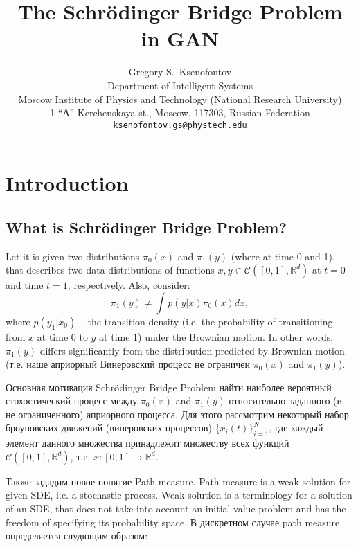 \documentclass{article}
\title{The Schrödinger Bridge Problem in GAN}
\author{ Gregory S.~Ksenofontov\\
	Department of Intelligent Systems\\
	Moscow Institute of Physics and Technology (National Research University)\\
	1 “А” Kerchenskaya st., Moscow, 117303, Russian Federation \\
	\texttt{ksenofontov.gs@phystech.edu} \\
}
\date{}
\begin{document}
\maketitle

\begin{abstract}
	\lipsum[1]
\end{abstract}



\section{Introduction}
\subsection{What is Schrödinger Bridge Problem?}
Let it is given two  distributions $\pi_0(x)$ and $\pi_1(y)$ (where at time 0 and 1), that describes two data distributions of  functions  $x, y\in\mathcal{C}([0,1], \mathbb{R}^d)$ at $t=0$ and time $t=1$, respectively. Also, consider:
$$\pi_1(y) \neq \int p(y|x)\pi_0(x)dx,$$
where $p(y_1|x_0)$ -- the transition density (i.e. the probability of transitioning from $x$ at time $0$ to $y$ at time $1$) under the Brownian motion. In other words, $\pi_1(y)$ differs significantly from the distribution predicted by Brownian motion (т.е. наше априорный Винеровский процесс не ограничен $\pi_0(x)$ and $\pi_1(y)$). \par 
Основная мотивация Schrödinger Bridge Problem найти наиболее вероятный стохостический процесс между $\pi_0(x)$ and $\pi_1(y)$ относительно заданного (и не ограниченного) априорного процесса. Для этого рассмотрим некоторый набор броуновских движений (винеровских процессов) \{$x_i(t)\}^N_{i=1}$, где каждый элемент данного множества принадлежит множеству всех функций $\mathcal{C}([0,1], \mathbb{R}^d)$, т.е. $x:[0,1]\rightarrow \mathbb{R}^d$.\par 
Также зададим новое понятие Path measure. Path measure is a weak solution for given SDE, i.e. a stochastic process. Weak solution is a terminology for a solution of an SDE, that does not take into account an initial value problem and has the freedom of specifying its probability space. В дискретном случае path measure определяется слудющим образом:
\end{document}
